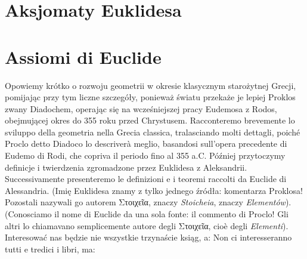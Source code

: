 
%

\section{Aksjomaty Euklidesa} %
\section{Assiomi di Euclide} %



Opowiemy krótko o rozwoju geometrii w okresie klasycznym starożytnej Grecji, pomijając przy tym liczne szczegóły, ponieważ światu przekaże je lepiej Proklos zwany Diadochem, operając się na wcześniejszej pracy Eudemosa z Rodos, obejmującej okres do 355 roku przed Chrystusem. %
Racconteremo brevemente lo sviluppo della geometria nella Grecia classica, tralasciando molti dettagli, poiché Proclo detto Diadoco lo descriverà meglio, basandosi sull'opera precedente di Eudemo di Rodi, che copriva il periodo fino al 355 a.C. %
Później przytoczymy definicje i twierdzenia zgromadzone przez Euklidesa z Aleksandrii. %
Successivamente presenteremo le definizioni e i teoremi raccolti da Euclide di Alessandria. %
(Imię Euklidesa znamy z tylko jednego źródła: komentarza Proklosa! Pozostali nazywali go autorem Στοιχεῖα, znaczy \emph{Stoicheia}, znaczy \emph{Elementów}). %
(Conosciamo il nome di Euclide da una sola fonte: il commento di Proclo! Gli altri lo chiamavano semplicemente autore degli Στοιχεῖα, cioè degli \emph{Elementi}). %
Interesować nas będzie nie wszystkie trzynaście ksiąg, a: %
Non ci interesseranno tutti e tredici i libri, ma: %
